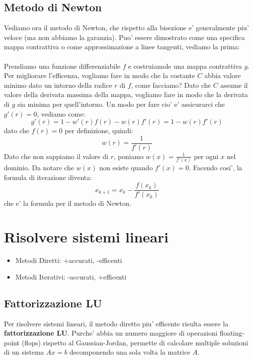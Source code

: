 \subsection{Metodo di Newton}
Vediamo ora il metodo di Newton, che rispetto alla bisezione e' generalmente piu' veloce (ma non abbiamo la garanzia). Puo' essere dimostrato come una specifica mappa contrattiva o come approssimazione a linee tangenti, vediamo la prima:\\\\
Prendiamo una funzione differenziabile $ f $ e costruiamole una mappa contrattiva $ g $. Per migliorare l'efficenza, vogliamo fare in modo che la costante $ C $ abbia valore minimo dato un intorno della radice $ r $ di $ f $, come facciamo? Dato che $ C $ assume il valore della derivata massima della mappa, vogliamo fare in modo che la derivata di $ g $ sia minima per quell'intorno. Un modo per fare cio' e' assicurarci che $ g'(r) = 0 $, vediamo come:
\[
  g'(r) = 1 - w'(r)f(r) - w(r)f'(r) = 1 - w(r)f'(r)
\]
dato che $ f(r) = 0 $ per definizione, quindi:
\[
  w(r) = \frac{1}{f'(r)}
\]
Dato che non sappiamo il valore di $ r $, poniamo $ w(x) = \frac{1}{f'(x)} $ per ogni $ x $ nel dominio. Da notare che $ w(x) $ non esiste quando $ f'(x) = 0 $. Facendo cosi', la formula di iterazione diventa:
\[
  x_{k+1} = x_k - \frac{f(x_k)}{f'(x_k)}
\]
che e' la formula per il metodo di Newton.
\section{Risolvere sistemi lineari}
\begin{itemize}
\item Metodi Diretti: +accurati, -efficenti
\item Metodi Iterativi: -accurati, +efficenti
\end{itemize}

\subsection{Fattorizzazione LU}
Per risolvere sistemi lineari, il metodo diretto piu' efficente risulta essere la \textbf{fattorizzazione LU}. Purche' abbia un numero maggiore di operazioni floating-point (flops) rispetto al Gaussian-Jordan, permette di calcolare multiple soluzioni di un sistema $ Ax = b $ decomponendo una sola volta la matrice $ A $. 

